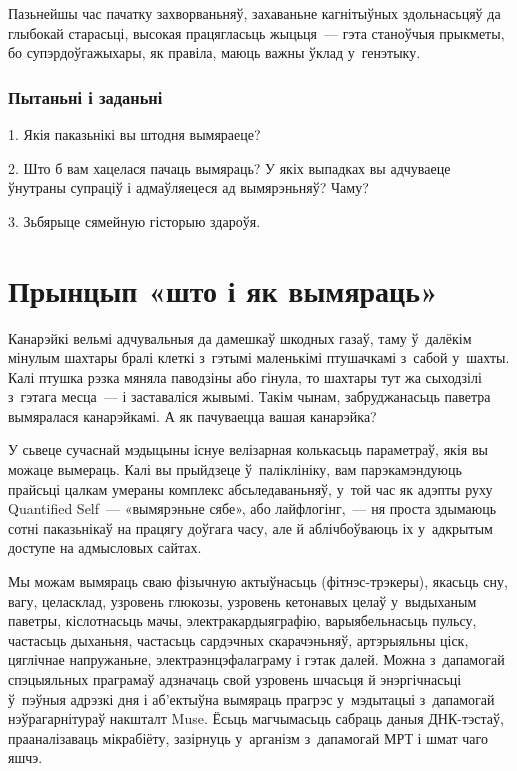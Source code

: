 Пазьнейшы час пачатку захворваньняў, захаваньне кагнітыўных здольнасьцяў да глыбокай старасьці, высокая працягласьць жыцьця~--- гэта станоўчыя прыкметы, бо супэрдоўгажыхары, як правіла, маюць важны ўклад у~генэтыку.

\subsubsection{Пытаньні і заданьні}

1. Якія паказьнікі вы штодня вымяраеце?

2. Што б вам хацелася пачаць вымяраць? У якіх выпадках вы адчуваеце ўнутраны супраціў і адмаўляецеся ад вымярэньняў? Чаму?

3. Зьбярыце сямейную гісторыю здароўя.


\section{Прынцып «што і як вымяраць»}

Канарэйкі вельмі адчувальныя да дамешкаў шкодных газаў, таму ў~далёкім мінулым шахтары бралі клеткі з~гэтымі маленькімі птушачкамі з~сабой у~шахты. Калі птушка рэзка мяняла паводзіны або гінула, то шахтары тут жа сыходзілі з~гэтага месца~--- і заставаліся жывымі. Такім чынам, забруджанасьць паветра вымяралася канарэйкамі. А як пачуваецца вашая канарэйка?

У сьвеце сучаснай мэдыцыны існуе велізарная колькасьць параметраў, якія вы можаце вымераць. Калі вы прыйдзеце ў~паліклініку, вам парэкамэндуюць прайсьці цалкам умераны комплекс абсьледаваньняў, у~той час як адэпты руху Quantified Self~--- «вымярэньне сябе», або лайфлогінг,~--- ня проста здымаюць сотні паказьнікаў на працягу доўгага часу, але й аблічбоўваюць іх у~адкрытым доступе на адмысловых сайтах.

Мы можам вымяраць сваю фізычную актыўнасьць (фітнэс-трэкеры), якасьць сну, вагу, целасклад, узровень глюкозы, узровень кетонавых целаў у~выдыханым паветры, кіслотнасьць мачы, электракардыяграфію, варыябельнасьць пульсу, частасьць дыханьня, частасьць сардэчных скарачэньняў, артэрыяльны ціск, цяглічнае напружаньне, электраэнцэфалаграму і гэтак далей. Можна з~дапамогай спэцыяльных праграмаў адзначаць свой узровень шчасьця й энэргічнасьці ў~пэўныя адрэзкі дня і аб'ектыўна вымяраць прагрэс у~мэдытацыі з~дапамогай нэўрагарнітураў накшталт Muse. Ёсьць магчымасьць сабраць даныя ДНК-тэстаў, прааналізаваць мікрабіёту, зазірнуць у~арганізм з~дапамогай МРТ і шмат чаго яшчэ.

